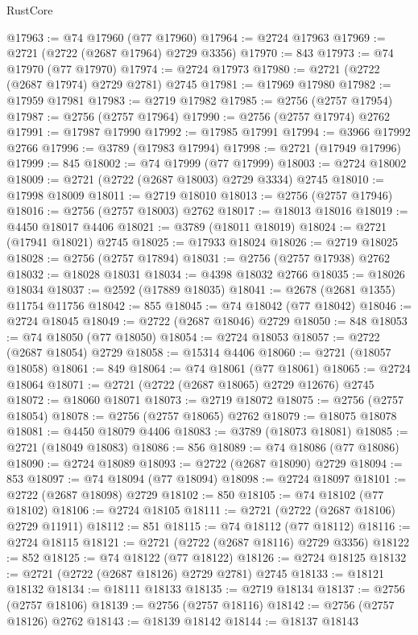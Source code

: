 \begin{lexlean}{RustCore}
\begin{coremodule}
@17963 := @74 @17960 (@77 @17960)
@17964 := @2724 @17963
@17969 := @2721 (@2722 (@2687 @17964) @2729 @3356)
@17970 := 843
@17973 := @74 @17970 (@77 @17970)
@17974 := @2724 @17973
@17980 := @2721 (@2722 (@2687 @17974) @2729 @2781) @2745
@17981 := @17969 @17980
@17982 := @17959 @17981
@17983 := @2719 @17982
@17985 := @2756 (@2757 @17954)
@17987 := @2756 (@2757 @17964)
@17990 := @2756 (@2757 @17974) @2762
@17991 := @17987 @17990
@17992 := @17985 @17991
@17994 := @3966 @17992 @2766
@17996 := @3789 (@17983 @17994)
@17998 := @2721 (@17949 @17996)
@17999 := 845
@18002 := @74 @17999 (@77 @17999)
@18003 := @2724 @18002
@18009 := @2721 (@2722 (@2687 @18003) @2729 @3334) @2745
@18010 := @17998 @18009
@18011 := @2719 @18010
@18013 := @2756 (@2757 @17946)
@18016 := @2756 (@2757 @18003) @2762
@18017 := @18013 @18016
@18019 := @4450 @18017 @4406
@18021 := @3789 (@18011 @18019)
@18024 := @2721 (@17941 @18021) @2745
@18025 := @17933 @18024
@18026 := @2719 @18025
@18028 := @2756 (@2757 @17894)
@18031 := @2756 (@2757 @17938) @2762
@18032 := @18028 @18031
@18034 := @4398 @18032 @2766
@18035 := @18026 @18034
@18037 := @2592 (@17889 @18035)
@18041 := @2678 (@2681 @1355) @11754 @11756
@18042 := 855
@18045 := @74 @18042 (@77 @18042)
@18046 := @2724 @18045
@18049 := @2722 (@2687 @18046) @2729
@18050 := 848
@18053 := @74 @18050 (@77 @18050)
@18054 := @2724 @18053
@18057 := @2722 (@2687 @18054) @2729
@18058 := @15314 @4406
@18060 := @2721 (@18057 @18058)
@18061 := 849
@18064 := @74 @18061 (@77 @18061)
@18065 := @2724 @18064
@18071 := @2721 (@2722 (@2687 @18065) @2729 @12676) @2745
@18072 := @18060 @18071
@18073 := @2719 @18072
@18075 := @2756 (@2757 @18054)
@18078 := @2756 (@2757 @18065) @2762
@18079 := @18075 @18078
@18081 := @4450 @18079 @4406
@18083 := @3789 (@18073 @18081)
@18085 := @2721 (@18049 @18083)
@18086 := 856
@18089 := @74 @18086 (@77 @18086)
@18090 := @2724 @18089
@18093 := @2722 (@2687 @18090) @2729
@18094 := 853
@18097 := @74 @18094 (@77 @18094)
@18098 := @2724 @18097
@18101 := @2722 (@2687 @18098) @2729
@18102 := 850
@18105 := @74 @18102 (@77 @18102)
@18106 := @2724 @18105
@18111 := @2721 (@2722 (@2687 @18106) @2729 @11911)
@18112 := 851
@18115 := @74 @18112 (@77 @18112)
@18116 := @2724 @18115
@18121 := @2721 (@2722 (@2687 @18116) @2729 @3356)
@18122 := 852
@18125 := @74 @18122 (@77 @18122)
@18126 := @2724 @18125
@18132 := @2721 (@2722 (@2687 @18126) @2729 @2781) @2745
@18133 := @18121 @18132
@18134 := @18111 @18133
@18135 := @2719 @18134
@18137 := @2756 (@2757 @18106)
@18139 := @2756 (@2757 @18116)
@18142 := @2756 (@2757 @18126) @2762
@18143 := @18139 @18142
@18144 := @18137 @18143

\end{coremodule}
\end{lexlean}
